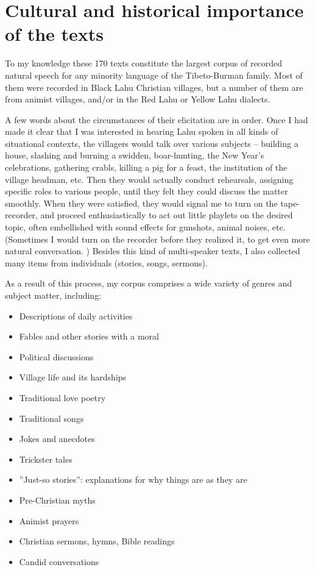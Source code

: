 \section{Cultural and historical importance of the texts}

To my knowledge these 170 texts constitute the largest corpus of recorded natural speech for any minority language of the Tibeto-Burman family. Most of them were recorded in Black Lahu Christian villages, but a number of them are from animist villages, and/or in the Red Lahu or Yellow Lahu dialects. 

A few words about the circumstances of their elicitation are in order. Once I had made it clear that I was interested in hearing Lahu spoken in all kinds of situational contexts, the villagers would talk over various subjects -- building a house, slashing and burning a swidden, boar-hunting, the New Year’s celebrations, gathering crabls, killing a pig for a feast, the institution of the village headman, etc. Then they would actually conduct rehearsals, assigning specific roles to various people, until they felt they could discuss the matter smoothly. When they were satisfied, they would signal me to turn on the tape-recorder, and proceed enthusiastically to act out little playlets on the desired topic, often embellished with sound effects for gunshots, animal noises, etc. (Sometimes I would turn on the recorder before they realized it, to get even more natural conversation. ) Besides this kind of multi-speaker texts, I also collected many items from individuals (stories, songs, sermons).

As a result of this process, my corpus comprises a wide variety of genres and subject matter, including:

\begin{itemize}
\item Descriptions of daily activities
\item Fables and other stories with a moral
\item Political discussions
\item Village life and its hardships
\item Traditional love poetry
\item Traditional songs
\item Jokes  and anecdotes
\item Trickster tales
\item ”Just-so stories”: explanations for why things are as they are
\item Pre-Christian myths
\item Animist prayers
\item Christian sermons, hymns, Bible readings
\item Candid conversations
\end{itemize}

